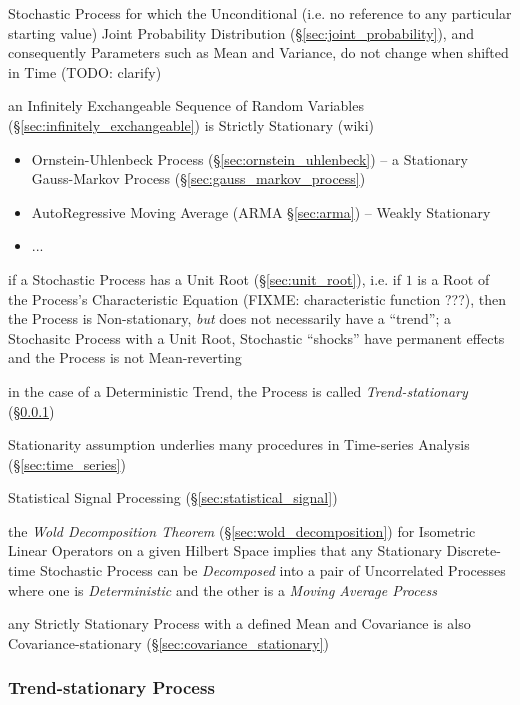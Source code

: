 Stochastic Process for which the Unconditional (i.e. no reference to any
particular starting value) Joint Probability Distribution
(\S\ref{sec:joint_probability}), and consequently Parameters such as Mean and
Variance, do not change when shifted in Time (TODO: clarify)

\fist an Infinitely Exchangeable Sequence of Random Variables
(\S\ref{sec:infinitely_exchangeable}) is Strictly Stationary (wiki)

\begin{itemize}
  \item Ornstein-Uhlenbeck Process (\S\ref{sec:ornstein_uhlenbeck}) -- a
    Stationary Gauss-Markov Process (\S\ref{sec:gauss_markov_process})
  \item AutoRegressive Moving Average (ARMA \S\ref{sec:arma}) -- Weakly
    Stationary
  \item ...
\end{itemize}

if a Stochastic Process has a Unit Root (\S\ref{sec:unit_root}), i.e. if $1$ is
a Root of the Process's Characteristic Equation (FIXME: characteristic function
???), then the Process is Non-stationary, \emph{but} does not necessarily have a
``trend''; a Stochasitc Process with a Unit Root, Stochastic ``shocks'' have
permanent effects and the Process is not Mean-reverting

in the case of a Deterministic Trend, the Process is called
\emph{Trend-stationary} (\S\ref{sec:trend_stationary})

\fist Stationarity assumption underlies many procedures in Time-series Analysis
(\S\ref{sec:time_series})

\fist Statistical Signal Processing (\S\ref{sec:statistical_signal})

the \emph{Wold Decomposition Theorem} (\S\ref{sec:wold_decomposition}) for
Isometric Linear Operators on a given Hilbert Space implies that any Stationary
Discrete-time Stochastic Process can be \emph{Decomposed} into a pair of
Uncorrelated Processes where one is \emph{Deterministic} and the other is a
\emph{Moving Average Process}

any Strictly Stationary Process with a defined Mean and Covariance is also
Covariance-stationary (\S\ref{sec:covariance_stationary})



\subsubsection{Trend-stationary Process}\label{sec:trend_stationary}


